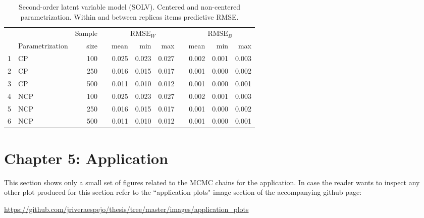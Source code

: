 %
\begin{table}[H]
	\centering
	\begin{tabular}{rlrrrrrrrrr}
		\hline
		&  & Sample && \multicolumn{3}{c}{ $\overline{\text{RMSE}}_{W}$ } && \multicolumn{3}{c}{ $\text{RMSE}_{B}$ } \\
		\cmidrule(rl){5-7} \cmidrule(rl){9-11}  
		& Parametrization & size  && mean & min & max && mean & min & max \\ 
		\hline\hline
		1 & CP & 100 && 0.025 & 0.023 & 0.027 && 0.002 & 0.001 & 0.003 \\
		2 & CP & 250 && 0.016 & 0.015 & 0.017 && 0.001 & 0.000 & 0.002 \\  
		3 & CP & 500 && 0.011 & 0.010 & 0.012 && 0.001 & 0.000 & 0.001 \\ 
		\hline
		4 & NCP & 100 && 0.025 & 0.023 & 0.027 && 0.002 & 0.001 & 0.003 \\
		5 & NCP & 250 && 0.016 & 0.015 & 0.017 && 0.001 & 0.000 & 0.002 \\ 
		6 & NCP & 500 && 0.011 & 0.010 & 0.012 && 0.001 & 0.000 & 0.001 \\  
		\hline
	\end{tabular}
	\caption[Second-order latent variable model (SOLV). Centered and non-centered parametrization. Within and between replicas items predictive RMSE.]%
	{Second-order latent variable model (SOLV). Centered and non-centered parametrization. Within and between replicas items predictive RMSE.}
	\label{tab:SOLV_accuracy_items}
\end{table}




\section{Chapter 5: Application} \label{app:chapter5}

This section shows only a small set of figures related to the MCMC chains for the application. In case the reader wants to inspect any other plot produced for this section refer to the ``application plots" image section of the accompanying github page:

\noindent \url{https://github.com/jriveraespejo/thesis/tree/master/images/application_plots} \\


